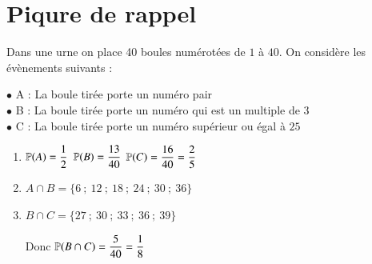 \documentclass[oneside,12pt]{exam}          %
\begin{document}
\section{Piqure de rappel}
Dans une urne on place 40 boules numérotées de $1$ à $40$. On considère les évènements suivants :

$\bullet$ A : \og La boule tirée porte un numéro pair \fg \\
$\bullet$ B : \og La boule tirée porte un numéro qui est un multiple de 3\fg \\
$\bullet$ C : \og La boule tirée porte un numéro supérieur ou égal à $25$ \fg
\begin{enumerate}[itemsep = 0pt]
	\item ${\mathbb P}(A) = \dfrac{1}{2}$ \quad ${\mathbb P}(B) = \dfrac{13}{40}$ \quad ${\mathbb P}(C) = \dfrac{16}{40} = \dfrac{2}{5}$
	\item $A \cap B = \{6 ~;~ 12 ~;~ 18 ~;~ 24 ~;~ 30 ~;~ 36\}$
	\item $B \cap C = \{27 ~;~ 30 ~;~ 33 ~;~ 36 ~;~ 39 \}$
	
	Donc ${\mathbb P}(B \cap C) = \dfrac{5}{40} = \dfrac{1}{8}$
\end{enumerate}
\end{document}
